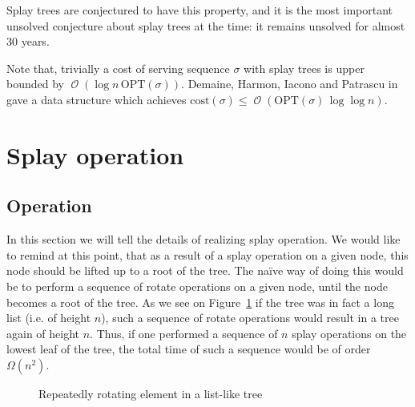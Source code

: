 \documentclass[11pt]{article}
\DeclareMathOperator*{\Oh}{\mathcal{O}}
\begin{document}
\begin{itemize}
		Splay trees are conjectured to have this property, and it is the most important unsolved conjecture about splay trees at the time: it remains unsolved for almost 30 years.
		
		Note that, trivially a cost of serving sequence $\sigma$ with splay trees is upper bounded by $\Oh(\log n \, \mathrm{OPT}(\sigma))$. Demaine, Harmon, Iacono and Patrascu in~\cite{DBLP:conf/focs/DemaineHIP04} gave a data structure which achieves $\mathrm{cost}(\sigma) \leq \Oh(\mathrm{OPT}(\sigma)\, \log \log n)$.
\end{itemize}
\section{Splay operation}
\label{splay}
\subsection{Operation}
In this section we will tell the details of realizing splay operation. We would like to remind at this point, that as a result of a splay operation on a given node, this node should be lifted up to a root of the tree. The naïve way of doing this would be to perform a sequence of rotate operations on a given node, until the node becomes a root of the tree. As we see on Figure~\ref{gorot} if the tree was in fact a long list (i.e. of height $n$), such a sequence of rotate operations would result in a tree again of height $n$. Thus, if one performed a sequence of $n$ splay operations on the lowest leaf of the tree, the total time of such a sequence would be of order $\Omega(n^2)$.
\begin{figure}
\begin{center}
\usetikzlibrary{shapes}
\end{center}
\caption{\label{gorot}Repeatedly rotating element in a list-like tree}
\end{figure}
\end{document}
